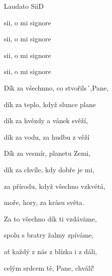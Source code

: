 \setcounter{page}{107}
\begin{song}{Laudato Sii}{D}{}

\begin{SBChorus}

 sii, o mi signore

 sii, o mi signore

 sii, o mi signore

 sii, o mi signore

\end{SBChorus}

\begin{SBVerse}

Dík za všechnno, co stvořils´,Pane,

dík za teplo, když slunce plane

dík za hvězdy a vánek svěží,

dík za vodu, za hudbu z věží

\end{SBVerse}

\begin{SBVerse}

Dík za vesmír, planetu Zemi,

dík za chvíle, kdy dobře je mi,

za přírodu, když všechno vzkvétá,

moře, hory, za krásu světa.

\end{SBVerse}

\begin{SBVerse}

Za to všechno dík ti vzdáváme,

spolu s bratry žalmy zpíváme,

ať každý z nás z blízka i z dáli,

celým srdcem tě, Pane, chválí!

\end{SBVerse}

\end{song}
